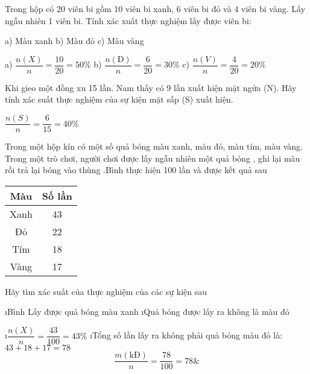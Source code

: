 \begin{bt}
	Trong hộp có 20 viên bi gồm 10 viên bi xanh, 6 viên bi đỏ và 4 viên bi vàng. Lấy ngẫu nhiên 1 viên bi. Tính xác xuất thực nghiệm lấy được viên bi:
	\begin{center}
		a) Màu xanh         \quad\quad\quad    b) Màu đỏ       \quad\quad\quad                   c) Màu vàng
	\end{center}
	\begin{loigiaichuong41}
			a) $\dfrac{n(X)}{n} = \dfrac{10}{20} = 50\%$\quad\quad
			b) $\dfrac{n(Đ)}{n} = \dfrac{6}{20} = 30\%$\quad\quad
			c) $\dfrac{n(V)}{n} = \dfrac{4}{20} = 20\%$
	\end{loigiaichuong41}
\end{bt}
\begin{bt}
	Khi gieo một đồng xu 15  lần. Nam thấy có  9 lần xuất hiện mặt ngửa (N). Hãy tính xác suất thực nghiệm của sự kiện mặt sấp (S) xuất hiện.
	\begin{loigiaichuong41}
		$\dfrac{{n(S)}}{n} = \dfrac{6}{{15}} = 40\% $
	\end{loigiaichuong41}
\end{bt}
\begin{bt}
	Trong một hộp kín có một số quả bóng màu xanh, màu đỏ, màu tím, màu vàng. Trong một trò chơi,  người chơi được lấy ngẫu nhiên một quả bóng , ghi lại màu rồi trả lại bóng vào thùng .Bình thực hiện 100 lần và được kết quả sau
	\begin{center}
		\begin{tabular}{|c|c|}
			\hline
			Màu	&Số lần\\
			\hline
			Xanh&	43\\
			\hline
			Đỏ&	22\\
			\hline
			Tím	&18\\
			\hline
			Vàng	&17\\
			\hline
		\end{tabular}
	\end{center}
	Hãy tìm xác suất của thực nghiệm của các sự kiện sau
	\begin{enumerate}[a),leftmargin=*]
		\i Bình Lấy được quả bóng màu xanh
		\i Quả bóng được lấy ra không là màu đỏ
	\end{enumerate}
	\begin{loigiaichuong41}
		\begin{enumerate}[a),leftmargin=*]
			\i $\dfrac{{n(X)}}{n} = \dfrac{{43}}{{100}} = 43\% $
			\i Tổng số lần lấy ra không phải quả bóng màu đỏ là: $43 + 18 + 17 = 78$
			\[\dfrac{m(\text{kĐ})}{n} = \dfrac{78}{100} = 78\&\]
		\end{enumerate}
	\end{loigiaichuong41}
\end{bt}
